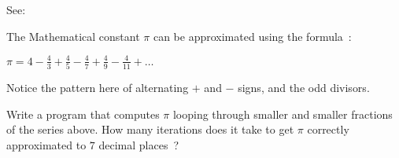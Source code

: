 
See:\\

The Mathematical constant $\pi$ can be approximated using the formula~:\\

\begin{center}
{\large
\begin{math}
	\pi = 4 - \frac{4}{3} + \frac{4}{5} - \frac{4}{7} + \frac{4}{9} - \frac{4}{11} + \ldots
\end{math}
}
\end{center}

Notice the pattern here of alternating $+$ and $-$ signs, and the odd divisors.

\begin{exercise}
Write a program that computes $\pi$ looping through smaller and smaller
fractions of the series above. How many iterations does it take to get $\pi$
correctly approximated to $7$ decimal places~?
\end{exercise}
